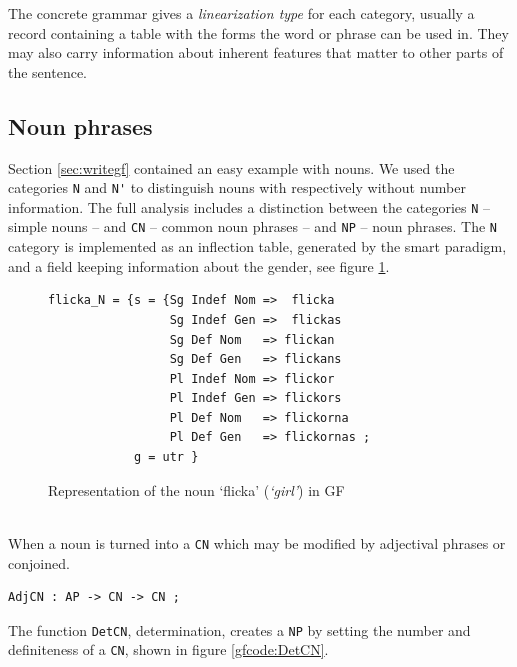 \documentclass{report}
\begin{document}
The concrete grammar gives a \textit{linearization type} for each category,
usually a record containing a table with the forms the word or phrase can be used in.
They may also
carry information about inherent features that matter to other parts of the sentence.

           
\newpage
\subsection{Noun phrases}
Section \ref{sec:writegf} contained an easy example with nouns. We used the categories \verb-N-
and \verb-N'- to distinguish nouns with respectively without number information.
The full analysis includes a distinction between the categories \verb-N- -- simple nouns --
and 
\verb-CN- -- common noun phrases -- and \verb-NP- -- noun phrases.
The \verb-N- category is implemented as an inflection table, generated by the smart paradigm,
and a field keeping information about the gender, see figure \ref{fig:gfflicka}.
\begin{figure}[h]
\begin{verbatim}
flicka_N = {s = {Sg Indef Nom =>  flicka
                 Sg Indef Gen =>  flickas
                 Sg Def Nom   => flickan
                 Sg Def Gen   => flickans
                 Pl Indef Nom => flickor
                 Pl Indef Gen => flickors
                 Pl Def Nom   => flickorna
                 Pl Def Gen   => flickornas ;
            g = utr }
\end{verbatim}
\caption{Representation of the noun `flicka' (\emph{`girl'}) in GF}
\label{fig:gfflicka}
\end{figure}\\
When a noun is turned into a \verb-CN- %
which may be modified by adjectival phrases or conjoined.
\begin{verbatim}
AdjCN : AP -> CN -> CN ; 
\end{verbatim}
The function \verb-DetCN-, determination, creates a
\verb-NP- by setting the number and definiteness of a \verb-CN-, shown in figure
\ref{gfcode:DetCN}.
\end{document}
